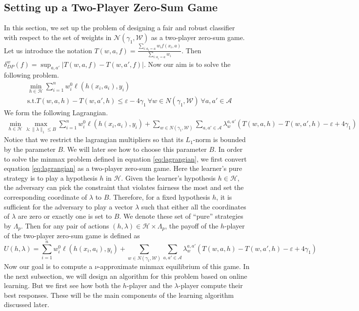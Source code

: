 \documentclass{article}
\newcommand{\WW}{\mathcal{W}}
\newcommand{\abs}[1]{\left|#1\right|}
\newcommand{\Ac}{\mathcal{A}}
\newcommand{\Nc}{\mathcal{N}}
\newcommand{\HH}{\mathcal{H}}
\newcommand{\eps}{\varepsilon}
\newcommand{\norm}[1]{\lVert #1 \rVert}
\begin{document}
 \subsection{Setting up a Two-Player Zero-Sum Game}
 In this section, we set up the problem of designing a fair and robust classifier with respect to the set of weights in $\Nc(\gamma_1,\WW)$ as a two-player zero-sum game. 
 Let us introduce the notation $T(w,a,f) = \frac{\sum_{i: a_i = a} w_i f(x_i,a)}{\sum_{i: a_i = a} w_i}$. Then $\delta^w_{DP}(f) = \sup_{a,a'}\abs{T(w,a,f) - T(w,a',f)}$. 
Now our aim is to solve the following problem.
\begin{align}
&\min_{h \in \HH} \sum_{i=1}^n w^0_i \ell(h(x_i,a_i),y_i)\label{eq:final-objective}\\
&\text{s.t.} T(w,a,h) - T(w,a',h) \le \eps - 4\gamma_1\ \forall w \in N(\gamma_1,\WW) \ \forall a,a' \in \Ac \nonumber
\end{align}
We form the following Lagrangian.
\begin{align}\label{eq:lagrangian}
\min_{h \in \HH} \max_{\lambda : \norm{\lambda}_1 \le B } \sum_{i=1}^n w^0_i \ell(h(x_i,a_i),y_i) + \sum_{w \in N(\gamma_1,\WW)} \sum_{a,a' \in \Ac} \lambda_w^{a,a'} ( T(w,a,h) - T(w,a',h) - \eps + 4\gamma_1)
\end{align}
Notice that we restrict the lagrangian multipliers so that its $L_1$-norm is bounded by the parameter $B$. We will later see how to choose this parameter $B$. In order to solve the minmax problem defined in equation \ref{eq:lagrangian}, we first convert equation \ref{eq:lagrangian} as a two-player zero-sum game. Here the learner's pure strategy is to play a hypothesis $h$ in $\HH$. Given the learner's hypothesis $h\in \HH$, the adversary can pick the constraint that violates fairness the most and set the corresponding coordinate of $\lambda$ to $B$. Therefore, for a fixed hypothesis $h$, it is sufficient for the adversary to play a vector $\lambda$ such that either all the coordinates of $\lambda$ are zero or exactly one is set to $B$. We denote these set of ``pure'' strategies by $\Lambda_p$. Then for any pair of actions $(h,\lambda) \in \HH \times \Lambda_p$, the payoff of the $h$-player of the two-player zero-sum game is defined as
\[U(h,\lambda) = \sum_{i=1}^n w^0_i \ell(h(x_i,a_i),y_i) + \sum_{w \in N(\gamma_1,\WW)} \sum_{a,a' \in \Ac} \lambda_w^{a,a'} ( T(w,a,h) - T(w,a',h) - \eps + 4\gamma_1) \]
Now our goal is to compute a $\nu$-approximate minmax equilibrium of this game. In the next subsection, we will design an algorithm for this problem based on online learning. But we first see how both the $h$-player and the $\lambda$-player compute their best responses. These will be the main components of the learning algorithm discussed later.
\end{document}
